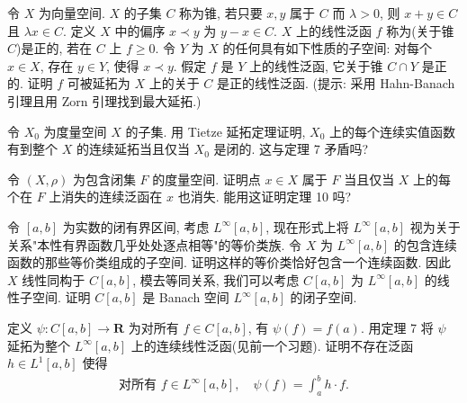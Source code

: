 \documentclass[../../main.tex]{subfiles}
\begin{document}
\begin{exercise}\label{exercise:ch14-26}
令 $X$ 为向量空间. $X$ 的子集 $C$ 称为锥, 若只要 $x,y$ 属于 $C$ 而 $\lambda>0$, 则 $x+y\in C$ 且 $\lambda x\in C$. 定义 $X$ 中的偏序 $x\prec y$ 为 $y-x\in C$. $X$ 上的线性泛函 $f$ 称为(关于锥 $C$)是正的, 若在 $C$ 上 $f\geqslant 0$. 令 $Y$ 为 $X$ 的任何具有如下性质的子空间: 对每个 $x\in X$, 存在 $y\in Y$, 使得 $x\prec y$. 假定 $f$ 是 $Y$ 上的线性泛函, 它关于锥 $C\cap Y$ 是正的. 证明 $f$ 可被延拓为 $X$ 上的关于 $C$ 是正的线性泛函. (提示: 采用 Hahn-Banach 引理且用 Zorn 引理找到最大延拓.)
\end{exercise}

\begin{exercise}\label{exercise:ch14-27}
令 $X_{0}$ 为度量空间 $X$ 的子集. 用 Tietze 延拓定理证明, $X_{0}$ 上的每个连续实值函数有到整个 $X$ 的连续延拓当且仅当 $X_{0}$ 是闭的. 这与定理 7 矛盾吗?
\end{exercise}

\begin{exercise}\label{exercise:ch14-28}
令 $(X,\rho)$ 为包含闭集 $F$ 的度量空间. 证明点 $x\in X$ 属于 $F$ 当且仅当 $X$ 上的每个在 $F$ 上消失的连续泛函在 $x$ 也消失. 能用这证明定理 10 吗?
\end{exercise}

\begin{exercise}\label{exercise:ch14-29}
令 $[a,b]$ 为实数的闭有界区间, 考虑 $L^{\infty}[a,b]$, 现在形式上将 $L^{\infty}[a,b]$ 视为关于关系"本性有界函数几乎处处逐点相等"的等价类族. 令 $X$ 为 $L^{\infty}[a,b]$ 的包含连续函数的那些等价类组成的子空间. 证明这样的等价类恰好包含一个连续函数. 因此 $X$ 线性同构于 $C[a,b]$, 模去等同关系, 我们可以考虑 $C[a,b]$ 为 $L^{\infty}[a,b]$ 的线性子空间. 证明 $C[a,b]$ 是 Banach 空间 $L^{\infty}[a,b]$ 的闭子空间.
\end{exercise}

\begin{exercise}\label{exercise:ch14-30}
定义 $\psi:C[a,b]\to\mathbf{R}$ 为对所有 $f\in C[a,b]$, 有 $\psi(f)=f(a)$. 用定理 7 将 $\psi$ 延拓为整个 $L^{\infty}[a,b]$ 上的连续线性泛函(见前一个习题). 证明不存在泛函 $h\in L^{1}[a,b]$ 使得
\begin{align*}
\text{对所有 }f\in L^{\infty}[a,b],\quad\psi(f)=\int_{a}^{b}h\cdot f.
\end{align*}
\end{exercise}
\end{document}
